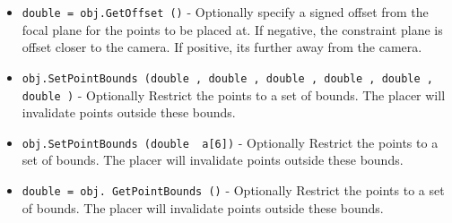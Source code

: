 \begin{itemize}
\item  \verb|double = obj.GetOffset ()| -  Optionally specify a signed offset from the focal plane for the points to
 be placed at.  If negative, the constraint plane is offset closer to the 
 camera. If positive, its further away from the camera.

\item  \verb|obj.SetPointBounds (double , double , double , double , double , double )| -  Optionally Restrict the points to a set of bounds. The placer will
 invalidate points outside these bounds.

\item  \verb|obj.SetPointBounds (double  a[6])| -  Optionally Restrict the points to a set of bounds. The placer will
 invalidate points outside these bounds.

\item  \verb|double = obj. GetPointBounds ()| -  Optionally Restrict the points to a set of bounds. The placer will
 invalidate points outside these bounds.

\end{itemize}
